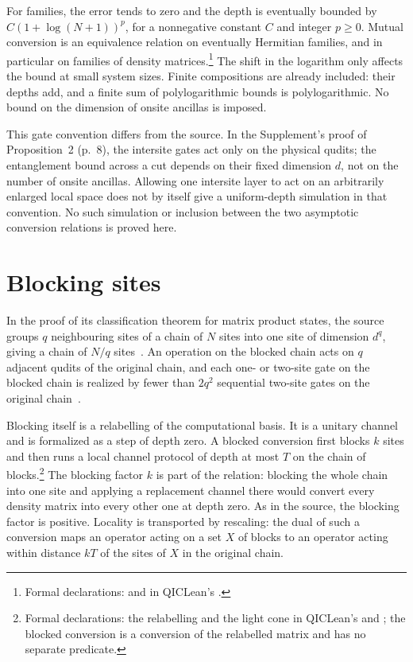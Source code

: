 \documentclass{article}
\begin{document}
For families, the error tends to zero and the depth is eventually bounded
by $C(1+\log(N+1))^p$, for a nonnegative constant $C$ and integer $p\ge0$.
Mutual conversion is an equivalence relation on eventually Hermitian
families, and in particular on families of density matrices.\footnote{Formal
    declarations:  and
     in
    QICLean's .}
The shift in the logarithm only affects the bound at small system sizes.
Finite compositions are already included: their depths add, and a finite sum
of polylogarithmic bounds is polylogarithmic. No bound on the dimension of
onsite ancillas is imposed.

This gate convention differs from the source. In the Supplement's proof of
Proposition~2 (p.~8), the intersite gates act only on the physical qudits;
the entanglement bound across a cut depends on their fixed dimension $d$,
not on the number of onsite ancillas. Allowing one intersite layer to act
on an arbitrarily enlarged local space does not by itself give a
uniform-depth simulation in that convention. No such simulation or
inclusion between the two asymptotic conversion relations is proved here.

\section{Blocking sites}
In the proof of its classification theorem for matrix product states, the
source groups $q$ neighbouring sites of a chain of $N$ sites into one site of
dimension $d^q$, giving a chain of $N/q$ sites~\cite[Supplemental Material;
    \texttt{main.tex} of arXiv:2103.13367v3, line 287]{Piroli2021LOCC}. An
operation on the blocked chain acts on $q$ adjacent qudits of the original
chain, and each one- or two-site gate on the blocked chain is realized by
fewer than $2q^2$ sequential two-site gates on the original
chain~\cite[\texttt{main.tex}, line 289]{Piroli2021LOCC}.

Blocking itself is a relabelling of the computational basis. It is a
unitary channel and is formalized as a step of depth zero. A blocked
conversion first blocks $k$ sites and then runs a local channel protocol of
depth at most $T$ on the chain of blocks.\footnote{Formal declarations: the
    relabelling  and the light cone
    in QICLean's  and
    ; the blocked conversion is a
    conversion of the relabelled matrix and has no separate predicate.}
The blocking factor $k$ is part of the relation: blocking the whole chain
into one site and applying a replacement channel there would convert every
density matrix into every other one at depth zero. As in the source, the
blocking factor is positive. Locality is transported by
rescaling: the dual of such a conversion maps an operator acting on a set
$X$ of blocks to an operator acting within distance $kT$ of the sites of
$X$ in the original chain.
\end{document}
